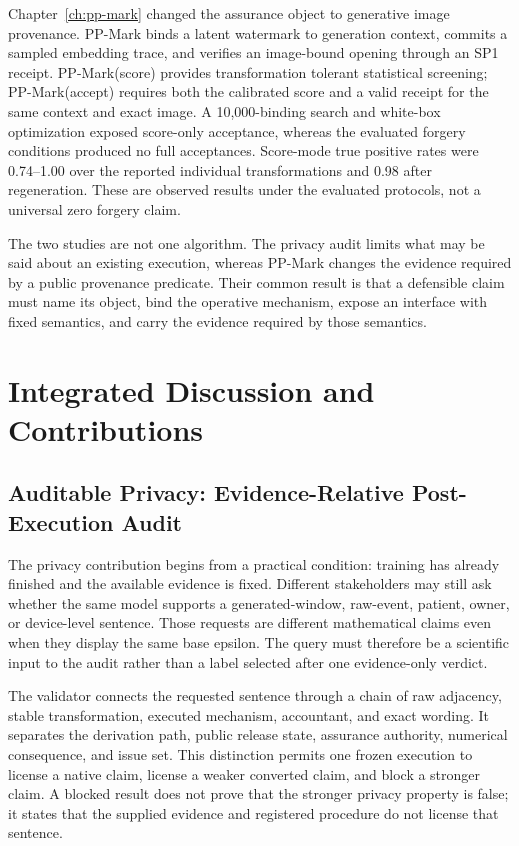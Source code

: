 Chapter~\ref{ch:pp-mark} changed the assurance object to generative image
provenance.  PP-Mark binds a latent watermark to generation context, commits a
sampled embedding trace, and verifies an image-bound opening through an SP1
receipt.  PP-Mark(score) provides transformation tolerant statistical screening;
PP-Mark(accept) requires both the calibrated score and a valid receipt for the same
context and exact image.  A 10,000-binding search and white-box optimization
exposed score-only acceptance, whereas the evaluated forgery conditions produced
no full acceptances.  Score-mode true positive rates were 0.74--1.00 over the
reported individual transformations and 0.98 after regeneration.  These are
observed results under the evaluated protocols, not a universal zero forgery
claim.

The two studies are not one algorithm.  The privacy audit limits what may be said
about an existing execution, whereas PP-Mark changes the evidence required by a
public provenance predicate.  Their common result is that a defensible claim must
name its object, bind the operative mechanism, expose an interface with fixed
semantics, and carry the evidence required by those semantics.


\section{Integrated Discussion and Contributions}
\label{sec:ch5-integrated-discussion}

\subsection{Auditable Privacy: Evidence-Relative Post-Execution Audit}
\label{subsec:ch5-auditable-privacy}

The privacy contribution begins from a practical condition: training has already
finished and the available evidence is fixed.  Different stakeholders may still
ask whether the same model supports a generated-window, raw-event, patient, owner,
or device-level sentence.  Those requests are different mathematical claims even
when they display the same base epsilon.  The query must therefore be a scientific
input to the audit rather than a label selected after one evidence-only verdict.

The validator connects the requested sentence through a chain of raw adjacency,
stable transformation, executed mechanism, accountant, and exact wording.  It
separates the derivation path, public release state, assurance authority, numerical
consequence, and issue set.  This distinction permits one frozen execution to
license a native claim, license a weaker converted claim, and block a stronger
claim.  A blocked result does not prove that the stronger privacy property is
false; it states that the supplied evidence and registered procedure do not
license that sentence.

